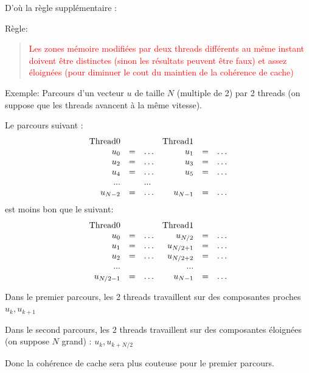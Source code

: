 \documentclass{beamer}
\begin{document}
\begin{frame}[fragile]
	D'où la règle supplémentaire :
	\vfill
	
	Règle: 
	\begin{quote}
        \textcolor{red}{Les zones mémoire modifiées par deux threads différents au même instant doivent être distinctes (sinon les résultats peuvent être faux) et assez éloignées (pour diminuer le cout du maintien de la cohérence de cache)}
	\end{quote}
		
	\vfill
	
\end{frame}
\begin{frame}[fragile]
	Exemple: Parcours d'un vecteur $u$ de taille $N$ (multiple de 2) par 2 threads (on suppose que les threads avancent à la même vitesse).
	
\vfill
	Le parcours suivant :
	$$
	\begin{array}{rclrcl}
	\hbox{Thread} 0 & & &\hbox{Thread} 1 & &\\
	u_0 & =& \ldots & u_1 & =& \ldots\\
	u_2 & =& \ldots & u_3 & =& \ldots \\
	u_4 & =& \ldots & u_5 & =& \ldots \\
	... & & ... & \\
	u_{N-2} & = &\ldots & u_{N-1} & = &\ldots \\
	\end{array}
	$$
	est moins bon que le suivant:
$$
\begin{array}{rclrcl}
\hbox{Thread} 0 & & &\hbox{Thread} 1 & &\\
u_0 & =& \ldots & u_{N/2} & =& \ldots\\
u_1 & =& \ldots & u_{N/2+1} & =& \ldots \\
u_2 & =& \ldots & u_{N/2+2} & =& \ldots \\
... & & &... & &\\
u_{N/2-1} & =& \ldots & u_{N-1} & =& \ldots \\
\end{array}
$$
	\vfill
\end{frame}
\begin{frame}
	Dans le premier parcours, les 2 threads travaillent sur des composantes proches $u_k, u_{k+1}$
	\bigskip
	
	Dans le second parcours, les 2 threads travaillent sur des composantes éloignées (on suppose $N$ grand) : $u_k, u_{k+N/2}$
	\vfill
	
	Donc la cohérence de cache sera plus couteuse pour le premier parcours.
	\vfill
\end{frame}
\end{document}
